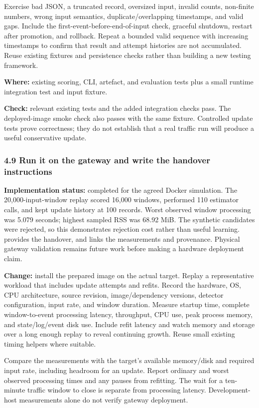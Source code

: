 \documentclass[11pt,a4paper]{article}
\begin{document}
Exercise bad JSON, a truncated record, oversized input, invalid counts,
non-finite numbers, wrong input semantics, duplicate/overlapping timestamps,
and valid gaps. Include the first-event-before-end-of-input check, graceful
shutdown, restart after promotion, and rollback. Repeat a bounded valid sequence
with increasing timestamps to confirm that result and attempt histories are not
accumulated. Reuse existing fixtures and persistence checks rather than building
a new testing framework.

\textbf{Where:} existing scoring, CLI, artefact, and evaluation tests plus a
small runtime integration test and input fixture.

\textbf{Check:} relevant existing tests and the added integration checks pass.
The deployed-image smoke check also passes with the same fixture. Controlled
update tests prove correctness; they do not establish that a real traffic run
will produce a useful conservative update.

\subsubsection*{4.9 Run it on the gateway and write the handover instructions}

\textbf{Implementation status:} completed for the agreed Docker simulation.
The 20,000-input-window replay scored 16,000 windows, performed 110 estimator
calls, and kept update history at 100 records. Worst observed window processing
was 5.079 seconds; highest sampled RSS was 68.92 MiB. The synthetic candidates
were rejected, so this demonstrates rejection cost rather than useful learning.
 provides the handover, and
 links the measurements and provenance. Physical
gateway validation remains future work before making a hardware deployment claim.

\textbf{Change:} install the prepared image on the actual target. Replay a
representative workload that includes update attempts and refits. Record the
hardware, OS, CPU architecture, source revision, image/dependency versions,
detector configuration, input rate, and window duration. Measure startup time,
complete window-to-event processing latency, throughput, CPU use, peak process
memory, and state/log/event disk use. Include refit latency and watch memory and
storage over a long enough replay to reveal continuing growth. Reuse small
existing timing helpers where suitable.

Compare the measurements with the target's available memory/disk and required
input rate, including headroom for an update. Report ordinary and worst observed
processing times and any pauses from refitting. The wait for a ten-minute
traffic window to close is separate from processing latency. Development-host
measurements alone do not verify gateway deployment.
\end{document}
